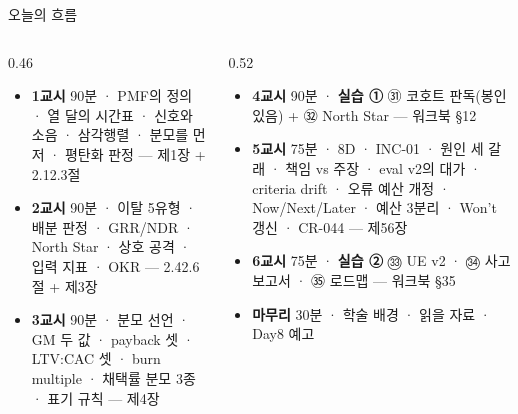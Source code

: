 \begin{frame}[shrink=6]{오늘의 흐름}
\begin{columns}[T]
\begin{column}{0.46\textwidth}
\begin{itemize}
\item \textbf{1교시} 90분 · PMF의 정의 · 열 달의 시간표 · 신호와 소음 · 삼각행렬 · 분모를 먼저 · 평탄화 판정 — 제1장 + 2.1\til{}2.3절
\item \textbf{2교시} 90분 · 이탈 5유형 · 배분 판정 · GRR/NDR · North Star · 상호 공격 · 입력 지표 · OKR — 2.4\til{}2.6절 + 제3장
\item \textbf{3교시} 90분 · 분모 선언 · GM 두 값 · payback 셋 · LTV:CAC 셋 · burn multiple · 채택률 분모 3종 · 표기 규칙 — 제4장
\end{itemize}
\end{column}
\begin{column}{0.52\textwidth}
\begin{itemize}
\item \textbf{4교시} 90분 · \textbf{실습 ①} ㉛ 코호트 판독(봉인 있음) + ㉜ North Star — 워크북 §1\til{}2
\item \textbf{5교시} 75분 · 8D · INC-01 · 원인 세 갈래 · 책임 vs 주장 · eval v2의 대가 · criteria drift · 오류 예산 개정 · Now/Next/Later · 예산 3분리 · Won't 갱신 · CR-044 — 제5\til{}6장
\item \textbf{6교시} 75분 · \textbf{실습 ②} ㉝ UE v2 · ㉞ 사고 보고서 · ㉟ 로드맵 — 워크북 §3\til{}5
\item \textbf{마무리} 30분 · 학술 배경 · 읽을 자료 · Day8 예고
\end{itemize}
\end{column}
\end{columns}
\end{frame}

